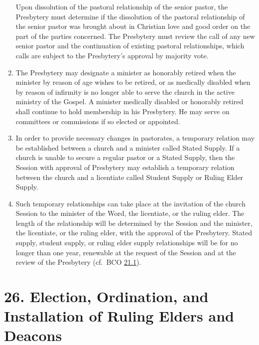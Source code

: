 \documentclass[
]{book}
\begin{document}
\begin{enumerate}
  Upon dissolution of the pastoral relationship of the senior pastor, the Presbytery must determine if the dissolution of the pastoral relationship of the senior pastor was brought about in Christian love and good order on the part of the parties concerned. The Presbytery must review the call of any new senior pastor and the continuation of existing pastoral relationships, which calls are subject to the Presbytery's approval by majority vote.
\item
  The Presbytery may designate a minister as honorably retired when the minister by reason of age wishes to be retired, or as medically disabled when by reason of infirmity is no longer able to serve the church in the active ministry of the Gospel. A minister medically disabled or honorably retired shall continue to hold membership in his Presbytery. He may serve on committees or commissions if so elected or appointed.
\item
  In order to provide necessary changes in pastorates, a temporary relation may be established between a church and a minister called Stated Supply. If a church is unable to secure a regular pastor or a Stated Supply, then the Session with approval of Presbytery may establish a temporary relation between the church and a licentiate called Student Supply or Ruling Elder Supply.
\item
  Such temporary relationships can take place at the invitation of the church Session to the minister of the Word, the licentiate, or the ruling elder. The length of the relationship will be determined by the Session and the minister, the licentiate, or the ruling elder, with the approval of the Presbytery. Stated supply, student supply, or ruling elder supply relationships will be for no longer than one year, renewable at the request of the Session and at the review of the Presbytery (cf.~BCO \protect\hyperlink{21.1}{21.1}).
\end{enumerate}

\hypertarget{election-ordination-and-installation-of-ruling-elders-and-deacons}{%
\section*{26. Election, Ordination, and Installation of Ruling Elders and Deacons}\label{election-ordination-and-installation-of-ruling-elders-and-deacons}}

\protect\hypertarget{chapter-slug-26-election-ordination-and-installation-of-ruling-elders-and-deacons}{\href{}{}}
\end{document}
